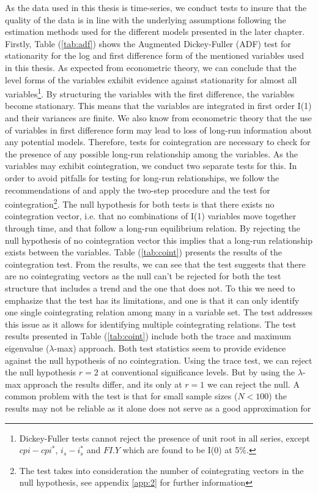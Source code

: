 \documentclass[10pt]{article}
\numberwithin{equation}{section}
\numberwithin{table}{section}
\numberwithin{figure}{section}
\begin{document}
\begin{spacing}{1.5}
\indent As the data used in this thesis is time-series, we conduct tests to insure that the quality of the data is in line with the underlying assumptions following the estimation methods used for the different models presented in the later chapter. Firstly, Table (\ref{tab:adf}) shows the Augmented Dickey-Fuller (ADF) test for stationarity \citep{dickey1979distribution} for the log and first difference form of the mentioned variables used in this thesis. As expected from econometric theory, we can conclude that the level forms of the variables exhibit evidence against stationarity for almost all variables\footnote{Dickey-Fuller tests cannot reject the presence of unit root in all series, except $cpi-cpi^*$, $i_s - i_s^*$ and $FI.Y$ which are found to be I(0) at 5\%.}. By structuring the variables with the first difference, the variables become stationary. This means that the variables are integrated in first order I(1) and their variances are finite. We also know from econometric theory that the use of variables in first difference form may lead to loss of long-run information about any potential models. Therefore, tests for cointegration are necessary to check for the presence of any possible long-run relationship among the variables. As the variables may exhibit cointegration, we conduct two separate tests for this. In order to avoid pitfalls for testing for long-run relationships, we follow the recommendations of \cite{gonzalo1998pitfalls} and apply the \cite{engle1987co} two-step procedure and the \cite{johansen1991estimation} test for cointegration\footnote{The \cite{johansen1991estimation} test takes into consideration the number of cointegrating vectors in the null hypothesis, see appendix \ref{app:2} for further information}. The null hypothesis for both tests is that there exists no cointegration vector, i.e. that no combinations of I(1) variables move together through time, and that follow a long-run equilibrium relation. By rejecting the null hypothesis of no cointegration vector this implies that a long-run relationship exists between the variables. Table (\ref{tab:coint}) presents the results of the cointegration test. From the results, we can see that the \cite{engle1987co} test suggests that there are no cointegrating vectors as the null can't be rejected for both the test structure that includes a trend and the one that does not. To this we need to emphasize that the \cite{engle1987co} test has its limitations, and one is that it can only identify one single cointegrating relation among many in a variable set. The \cite{johansen1991estimation} test addresses this issue as it allows for identifying multiple cointegrating relations. The test results presented in Table (\ref{tab:coint}) include both the trace and maximum eigenvalue ($\lambda$-max) approach. Both test statistics seem to provide evidence against the null hypothesis of no cointegration. Using the trace test, we can reject the null hypothesis $r=2$ at conventional significance levels. But by using the $\lambda$-max approach the results differ, and its only at $r=1$ we can reject the null. A common problem with the \cite{johansen1991estimation} test is that for small sample sizes ($N < 100$) the results may not be reliable as it alone does not serve as a good approximation for 
\end{spacing}
\end{document}
